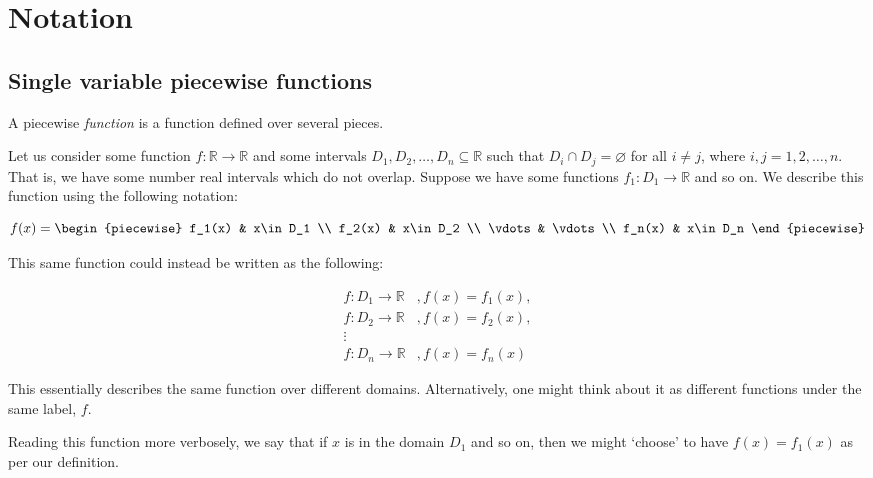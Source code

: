 \label{section:notation}
\section{Notation}
\subsection{Single variable piecewise functions}
A piecewise \textit{function} is a function defined over several pieces.

Let us consider some function $f:\mathbb{R}\to\mathbb{R}$ and some intervals ${D_1,D_2,\dots,D_n\subseteq\mathbb{R}}$ such that $D_i\cap D_j=\varnothing$ for all $i\neq j$, where $i,j=1,2,\dots,n$. That is, we have some number real intervals which do not overlap. Suppose we have some functions $f_1: D_1\to\mathbb{R}$ and so on. We describe this function using the following notation:

$$
    f(x) = \begin{piecewise}
                f_1(x) & x\in D_1 \\
                f_2(x) & x\in D_2 \\
                \vdots & \vdots \\
                f_n(x) & x\in D_n
            \end{piecewise}
$$

This same function could instead be written as the following:

\begin{align*}
    f:D_1\to\mathbb{R}&, f(x)=f_1(x), \\
    f:D_2\to\mathbb{R}&, f(x)=f_2(x), \\
    \vdots \\
    f:D_n\to\mathbb{R}&, f(x)=f_n(x)
\end{align*}

This essentially describes the same function over different domains. Alternatively, one might think about it as different functions under the same label, $f$.

Reading this function more verbosely, we say that if $x$ is in the domain $D_1$ and so on, then we might `choose' to have $f(x)=f_1(x)$ as per our definition.

